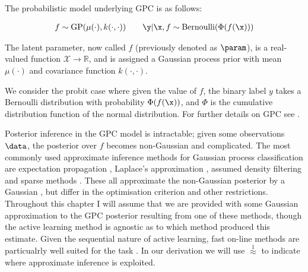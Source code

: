  The probabilistic model underlying GPC is as follows:

\begin{align}
	f \sim \mathrm{GP}(\mu(\cdot),k(\cdot,\cdot)) \qquad \y\vert\x,f \sim\mathrm{Bernoulli}(\Phi(f(\x))) 
\end{align}

The latent parameter, now called $f$ (previously denoted as $\param$), is a real-valued function $\mathcal{X}\rightarrow\mathbb{R}$, and is assigned a Gaussian process prior with mean $\mu(\cdot)$ and covariance function $k(\cdot,\cdot)$.

We consider the probit case where given the value of $f$, the binary label $y$ takes a Bernoulli distribution with probability $\Phi(f(\x))$, and $\Phi$ is the cumulative distribution function of the normal distribution. For further details on GPC see \citep{rasmussen2005}.

Posterior inference in the GPC model is intractable; given some observations $\data$, the posterior over $f$ becomes non-Gaussian and complicated. The most commonly used approximate inference methods for Gaussian process classification are expectation propagation \citep[EP,][]{Minka2002}, Laplace's approximation \citep{williams1998}, assumed density filtering \citep[ADF,][]{csato2000} and sparse methods \citep{candela05sparseGP}. These all approximate the non-Gaussian posterior by a Gaussian \citep{Nickisch2008}, but differ in the optimisation criterion and other restrictions. Throughout this chapter I will assume that we are provided with some Gaussian approximation to the GPC posterior resulting from one of these methods, though the active learning method is agnostic as to which method produced this estimate. Given the sequential nature of active learning, fast on-line methods are particualrly well suited for the task \citep{Csato2002}. In our derivation we will use {\scriptsize$\stackrel{1}{\approx}$} to indicate where approximate inference is exploited.

